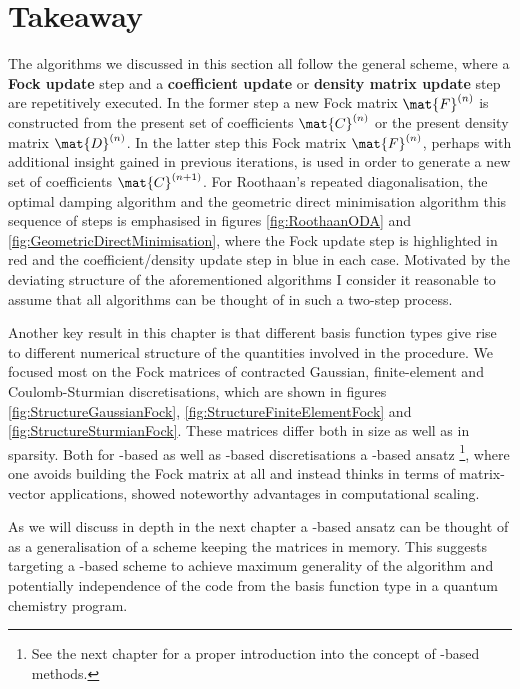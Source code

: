 \section{Takeaway}
The \SCF algorithms we discussed in this section all follow the general scheme,
where a \textbf{Fock update} step and
a \textbf{coefficient update} or \textbf{density matrix update}
step are repetitively executed.
In the former step a new Fock matrix $\mat{F}^{(n)}$ is constructed from
the present set of \SCF coefficients $\mat{C}^{(n)}$
or the present density matrix $\mat{D}^{(n)}$.
In the latter step this Fock matrix $\mat{F}^{(n)}$,
perhaps with additional insight gained in previous iterations,
is used in order to generate a new set of coefficients $\mat{C}^{(n+1)}$.
For Roothaan's repeated diagonalisation,
the optimal damping algorithm and the geometric direct minimisation algorithm
this sequence of steps is emphasised in figures
\vref{fig:RoothaanODA} and \vref{fig:GeometricDirectMinimisation},
where the Fock update step is highlighted in red
and the coefficient/density update step in blue in each case.
Motivated by the deviating structure of the aforementioned
algorithms I consider it reasonable
to assume that all \SCF algorithms can be thought of in such
a two-step process.

Another key result in this chapter is
that different basis function types give rise to
different numerical structure
of the quantities involved in the \SCF procedure.
We focused most on the Fock matrices
of contracted Gaussian, finite-element and Coulomb-Sturmian discretisations,
which are shown in figures
\vref{fig:StructureGaussianFock},
\vref{fig:StructureFiniteElementFock}
and \vref{fig:StructureSturmianFock}.
These matrices differ both in size as well as in sparsity.
Both for \FE-based as well as \CS-based
discretisations a \contraction-based ansatz%
\footnote{See the next chapter for a proper introduction into the concept
of \contraction-based methods.},
where one avoids building the Fock matrix at all
and instead thinks in terms of matrix-vector applications,
showed noteworthy advantages in computational scaling.

As we will discuss in depth in the next chapter
a \contraction-based ansatz can be thought of as a generalisation
of a scheme keeping the matrices in memory.
This suggests targeting a \contraction-based \SCF scheme to achieve
maximum generality of the \SCF algorithm
and potentially independence of the \SCF code from
the basis function type in a quantum chemistry program.

